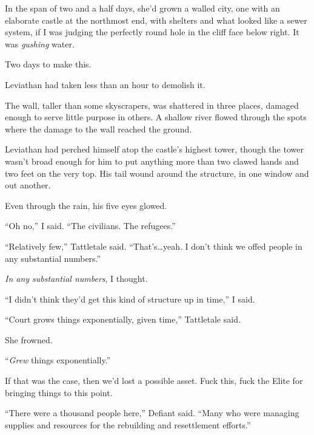 In the span of two and a half days, she'd grown a walled city, one with an elaborate castle at the northmost end, with shelters and what looked like a sewer system, if I was judging the perfectly round hole in the cliff face below right.  It was \emph{gushing} water.



Two days to make this.



Leviathan had taken less than an hour to demolish it.



The wall, taller than some skyscrapers, was shattered in three places, damaged enough to serve little purpose in others.  A shallow river flowed through the spots where the damage to the wall reached the ground.



Leviathan had perched himself atop the castle's highest tower, though the tower wasn't broad enough for him to put anything more than two clawed hands and two feet on the very top.  His tail wound around the structure, in one window and out another.



Even through the rain, his five eyes glowed.



``Oh no,'' I said.  ``The civilians.  The refugees.''



``Relatively few,'' Tattletale said.  ``That's\ldots yeah.  I don't think we offed people in any substantial numbers.''



\emph{In any substantial numbers}, I thought.



``I didn't think they'd get this kind of structure up in time,'' I said.



``Court grows things exponentially, given time,'' Tattletale said.



She frowned.



``\emph{Grew} things exponentially.''



If that was the case, then we'd lost a possible asset.  Fuck this, fuck the Elite for bringing things to this point.



``There were a thousand people here,'' Defiant said.  ``Many who were managing supplies and resources for the rebuilding and resettlement efforts.''



